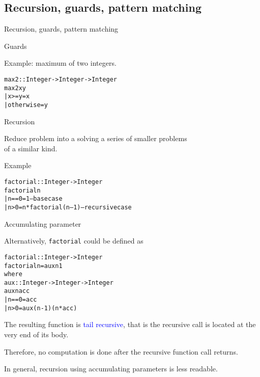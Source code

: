 \documentclass{beamer}
\def\code#1{\texttt{\frenchspacing#1}}
\begin{document}
\subsection{Recursion, guards, pattern matching}

\begin{frame}[fragile]{Recursion, guards, pattern matching}

\begin{block}{Guards}
\pause
\begin{exampleblock}{Example: maximum of two integers.}
\begin{alltt}
max2 :: Integer -> Integer -> Integer
max2 x y\pause
  | x >= y    = x
  | otherwise = y
\end{alltt}
\end{exampleblock}
\end{block}

\end{frame}

\begin{frame}[fragile]{Recursion}

\begin{block}{\centering Reduce problem into a solving a series of smaller problems \\ of a similar kind.}
\end{block}

\begin{exampleblock}{Example}
\begin{alltt}
factorial :: Integer -> Integer
factorial n\pause
  | n == 0 = 1                       -- base case
  | n > 0  = n * factorial (n – 1)   -- recursive case
\end{alltt}
\end{exampleblock}

\end{frame}

\begin{frame}[fragile]{Accumulating parameter}

Alternatively, \code{factorial} could be defined as

\begin{alltt}
factorial :: Integer -> Integer\pause
factorial n = aux n 1
  where
    aux :: Integer -> Integer -> Integer
    aux n acc\pause
      | n == 0 = acc
      | n > 0  = aux (n - 1) (n * acc)
\end{alltt}

\pause

The resulting function is \textcolor{blue}{tail recursive}, that is the recursive call is located at the very end of its body. \par
Therefore, no computation is done after the recursive function call returns.

\pause

\vspace{1cm}
In general, recursion using accumulating parameters is less readable.

\end{frame}
\end{document}
